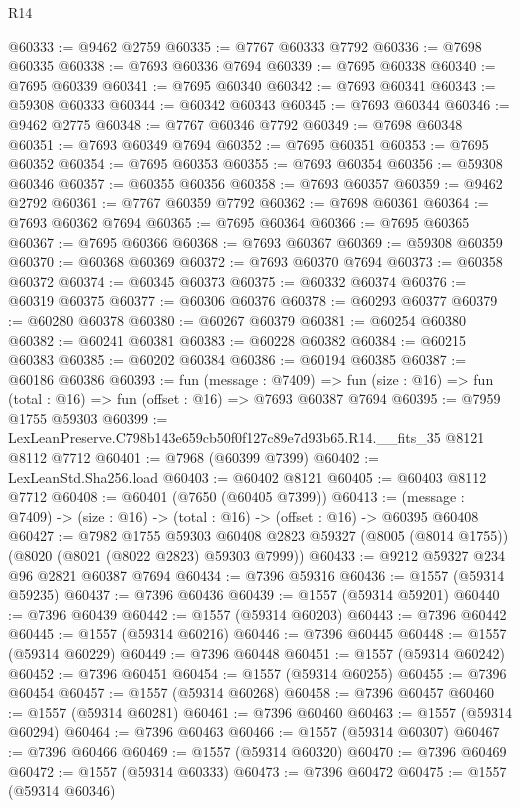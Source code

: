\begin{lexlean}{R14}
\begin{coremodule}
@60333 := @9462 @2759
@60335 := @7767 @60333 @7792
@60336 := @7698 @60335
@60338 := @7693 @60336 @7694
@60339 := @7695 @60338
@60340 := @7695 @60339
@60341 := @7695 @60340
@60342 := @7693 @60341
@60343 := @59308 @60333
@60344 := @60342 @60343
@60345 := @7693 @60344
@60346 := @9462 @2775
@60348 := @7767 @60346 @7792
@60349 := @7698 @60348
@60351 := @7693 @60349 @7694
@60352 := @7695 @60351
@60353 := @7695 @60352
@60354 := @7695 @60353
@60355 := @7693 @60354
@60356 := @59308 @60346
@60357 := @60355 @60356
@60358 := @7693 @60357
@60359 := @9462 @2792
@60361 := @7767 @60359 @7792
@60362 := @7698 @60361
@60364 := @7693 @60362 @7694
@60365 := @7695 @60364
@60366 := @7695 @60365
@60367 := @7695 @60366
@60368 := @7693 @60367
@60369 := @59308 @60359
@60370 := @60368 @60369
@60372 := @7693 @60370 @7694
@60373 := @60358 @60372
@60374 := @60345 @60373
@60375 := @60332 @60374
@60376 := @60319 @60375
@60377 := @60306 @60376
@60378 := @60293 @60377
@60379 := @60280 @60378
@60380 := @60267 @60379
@60381 := @60254 @60380
@60382 := @60241 @60381
@60383 := @60228 @60382
@60384 := @60215 @60383
@60385 := @60202 @60384
@60386 := @60194 @60385
@60387 := @60186 @60386
@60393 := fun (message : @7409) =>
  fun (size : @16) => fun (total : @16) => fun (offset : @16) => @7693 @60387 @7694
@60395 := @7959 @1755 @59303
@60399 := LexLeanPreserve.C798b143e659cb50f0f127c89e7d93b65.R14.__fits_35 @8121 @8112 @7712
@60401 := @7968 (@60399 @7399)
@60402 := LexLeanStd.Sha256.load
@60403 := @60402 @8121
@60405 := @60403 @8112 @7712
@60408 := @60401 (@7650 (@60405 @7399))
@60413 := (message : @7409) -> (size : @16) -> (total : @16) -> (offset : @16) -> @60395 @60408
@60427 := @7982
    @1755
    @59303
    @60408
    @2823
    @59327
    (@8005 (@8014 @1755))
    (@8020 (@8021 (@8022 @2823) @59303 @7999))
@60433 := @9212 @59327 @234 @96 @2821 @60387 @7694
@60434 := @7396 @59316
@60436 := @1557 (@59314 @59235)
@60437 := @7396 @60436
@60439 := @1557 (@59314 @59201)
@60440 := @7396 @60439
@60442 := @1557 (@59314 @60203)
@60443 := @7396 @60442
@60445 := @1557 (@59314 @60216)
@60446 := @7396 @60445
@60448 := @1557 (@59314 @60229)
@60449 := @7396 @60448
@60451 := @1557 (@59314 @60242)
@60452 := @7396 @60451
@60454 := @1557 (@59314 @60255)
@60455 := @7396 @60454
@60457 := @1557 (@59314 @60268)
@60458 := @7396 @60457
@60460 := @1557 (@59314 @60281)
@60461 := @7396 @60460
@60463 := @1557 (@59314 @60294)
@60464 := @7396 @60463
@60466 := @1557 (@59314 @60307)
@60467 := @7396 @60466
@60469 := @1557 (@59314 @60320)
@60470 := @7396 @60469
@60472 := @1557 (@59314 @60333)
@60473 := @7396 @60472
@60475 := @1557 (@59314 @60346)

\end{coremodule}
\end{lexlean}
